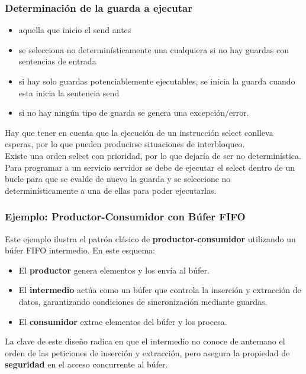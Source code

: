 \documentclass[a4paper,12pt]{article}
\begin{document}
\subsubsection{Determinación de la guarda a ejecutar}
\begin{itemize}
    \item aquella que inicio el send antes
    \item se selecciona no determinísticamente una cualquiera si no hay guardas con sentencias de entrada
    \item si hay solo guardas potenciablemente ejecutables, se inicia la guarda cuando esta inicia la sentencia send
    \item si no hay ningún tipo de guarda se genera una excepción/error.
\end{itemize}

Hay que tener en cuenta que la ejecución de un instrucción select conlleva esperas, por lo que pueden producirse situaciones de interbloqueo.\\

Existe una orden select con prioridad, por lo que dejaría de ser no determinística.\\

Para programar a un servicio servidor se debe de ejecutar el select dentro de un bucle para que se evalúe de nuevo la guarda y se seleccione no determinísticamente a una de ellas para poder ejecutarlas.

\subsubsection{Ejemplo: Productor-Consumidor con Búfer FIFO}

Este ejemplo ilustra el patrón clásico de \textbf{productor-consumidor} utilizando un búfer FIFO intermedio. En este esquema:

\begin{itemize}
    \item El \textbf{productor} genera elementos y los envía al búfer.
    \item El \textbf{intermedio} actúa como un búfer que controla la inserción y extracción de datos, garantizando condiciones de sincronización mediante guardas.
    \item El \textbf{consumidor} extrae elementos del búfer y los procesa.
\end{itemize}

La clave de este diseño radica en que el intermedio no conoce de antemano el orden de las peticiones de inserción y extracción, pero asegura la propiedad de \textbf{seguridad} en el acceso concurrente al búfer.
\end{document}
